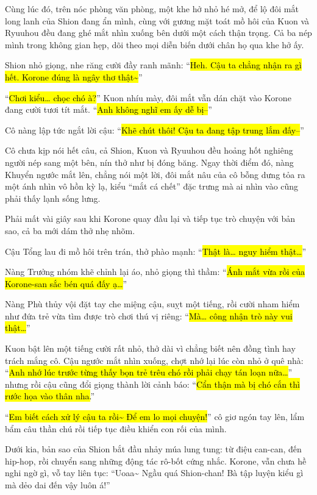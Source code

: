 \documentclass[../main.tex]{subfiles}
\begin{document}
Cùng lúc đó, trên nóc phòng văn phòng, một khe hở nhỏ hé mở, để lộ đôi mắt long lanh của Shion đang ẩn mình, cùng với gương mặt toát mồ hôi của Kuon và Ryuuhou đều đang ghé mắt nhìn xuống bên dưới một cách thận trọng. Cả ba nép mình trong không gian hẹp, dõi theo mọi diễn biến dưới chân họ qua khe hở ấy.


Shion nhỏ giọng, nhe răng cười đầy ranh mãnh: ``\hl{Heh. Cậu ta chẳng nhận ra gì hết. Korone đúng là ngây thơ thật\~{}}''

``\hl{Chơi kiểu\dots{} chọc chó à?}'' Kuon nhíu mày, đôi mắt vẫn dán chặt vào Korone đang cười tươi tít mắt. ``\hl{Anh không nghĩ em ấy dễ bị--}''

Cô nàng lập tức ngắt lời cậu: ``\hl{Khẽ chút thôi! Cậu ta đang tập trung lắm đấy--}''

Cô chưa kịp nói hết câu, cả Shion, Kuon và Ryuuhou đều hoảng hốt nghiêng người nép sang một bên, nín thở như bị đóng băng. Ngay thời điểm đó, nàng Khuyển ngước mắt lên, chẳng nói một lời, đôi mắt nâu của cô bỗng dưng tỏa ra một ánh nhìn vô hồn kỳ lạ, kiểu ``mắt cá chết'' đặc trưng mà ai nhìn vào cũng phải thấy lạnh sống lưng.


Phải mất vài giây sau khi Korone quay đầu lại và tiếp tục trò chuyện với bản sao, cả ba mới dám thở nhẹ nhõm.

Cậu Tổng lau đi mồ hôi trên trán, thở phào mạnh: ``\hl{Thật là\dots{} nguy hiểm thật\dots}''

Nàng Trưởng nhóm khẽ chỉnh lại áo, nhỏ giọng thì thầm: ``\hl{Ánh mắt vừa rồi của Korone-san sắc bén quá đấy ạ\dots}''

Nàng Phù thủy vội đặt tay che miệng cậu, suỵt một tiếng, rồi cười nham hiểm như đứa trẻ vừa tìm được trò chơi thú vị riêng: ``\hl{Mà\dots{} công nhận trò này vui thật\dots}''

Kuon bật lên một tiếng cười rất nhỏ, thở dài vì chẳng biết nên đồng tình hay trách mắng cô. Cậu ngước mắt nhìn xuống, chợt nhớ lại lúc còn nhỏ ở quê nhà: ``\hl{Anh nhớ lúc trước từng thấy bọn trẻ trêu chó rồi phải chạy tán loạn nữa\dots}'' nhưng rồi cậu cũng đổi giọng thành lời cảnh báo: ``\hl{Cẩn thận mà bị chó cắn thì rước họa vào thân nha.}''

``\hl{Em biết cách xử lý cậu ta rồi\~{} Để em lo mọi chuyện!}'' cô giơ ngón tay lên, lẩm bẩm câu thần chú rồi tiếp tục điều khiển con rối của mình.

Dưới kia, bản sao của Shion bắt đầu nhảy múa lung tung: từ điệu can-can, đến hip-hop, rồi chuyển sang những động tác rô-bốt cứng nhắc. Korone, vẫn chưa hề nghi ngờ gì, vỗ tay liên tục: ``Uoaa\~{} Ngầu quá Shion-chan! Bà tập luyện kiểu gì mà dẻo dai đến vậy luôn á!''
\end{document}
